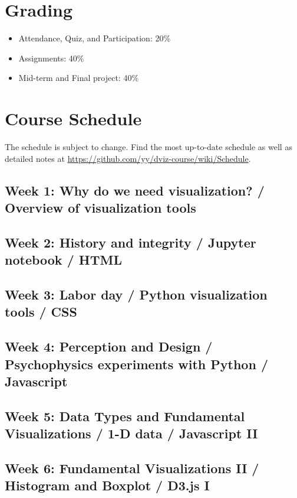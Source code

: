 \documentclass[11pt,article,oneside]{memoir} %
\begin{document}
\section{Grading}%
\label{sec:grading_tentative_}

\begin{itemize}%

\item Attendance, Quiz, and Participation: 20\%

\item Assignments: 40\%

\item Mid-term and Final project: 40\%

\end{itemize}%
\section{Course Schedule}%

The schedule is subject to change. Find the most up-to-date schedule as well as
detailed notes at \url{https://github.com/yy/dviz-course/wiki/Schedule}.

\subsection{Week 1: Why do we need visualization? / Overview of visualization tools}
\subsection{Week 2: History and integrity / Jupyter notebook / HTML}
\subsection{Week 3: Labor day / Python visualization tools / CSS}
\subsection{Week 4: Perception and Design / Psychophysics experiments with Python / Javascript}
\subsection{Week 5: Data Types and Fundamental Visualizations / 1-D data / Javascript II}
\subsection{Week 6: Fundamental Visualizations II / Histogram and Boxplot /  D3.js I} 
\end{document}
